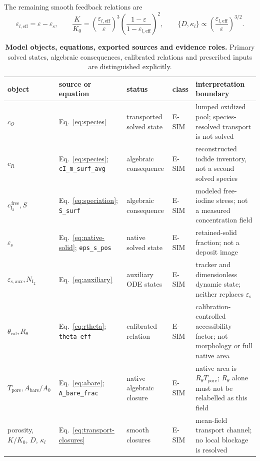 \documentclass[11pt]{article}
\newcommand{\epss}{\varepsilon_{\mathrm{s}}}
\newcommand{\epsaux}{\varepsilon_{\mathrm{s,aux}}}
\newcommand{\thetacal}{\theta_{\mathrm{cal}}}
\newcommand{\Rtheta}{R_{\theta}}
\newcommand{\Tpore}{T_{\mathrm{pore}}}
\newcommand{\cf}{c_{\mathrm{I_2}}^{\,\mathrm{free}}}
\begin{document}
The remaining smooth feedback relations are
\begin{equation}
\varepsilon_{l,\mathrm{eff}}=\varepsilon-\epss,\qquad
\frac{K}{K_0}=\left(\frac{\varepsilon_{l,\mathrm{eff}}}{\varepsilon}\right)^3
\left(\frac{1-\varepsilon}{1-\varepsilon_{l,\mathrm{eff}}}\right)^2,\qquad
\{D,\kappa_l\}\propto\left(\frac{\varepsilon_{l,\mathrm{eff}}}{\varepsilon}\right)^{3/2}.
\label{eq:transport-closures}
\end{equation}

\begin{table}[!htbp]
\centering\footnotesize
\caption{\textbf{Model objects, equations, exported sources and evidence roles.} Primary solved states,
algebraic consequences, calibrated relations and prescribed inputs are distinguished explicitly.}
\label{tab:model-map}
\begin{tabularx}{\textwidth}{@{}P{2.25cm}P{2.55cm}P{2.15cm}P{1.25cm}Y@{}}
\toprule
object & source or equation & status & class & interpretation boundary\\
\midrule
$c_O$ & Eq.~\eqref{eq:species} & transported solved state & E-SIM & lumped oxidized pool; species-resolved transport is not solved\\
$c_R$ & Eq.~\eqref{eq:species}; \texttt{cI\_m\_surf\_avg} & algebraic consequence & E-SIM & reconstructed iodide inventory, not a second solved species\\
$\cf,S$ & Eq.~\eqref{eq:speciation}; \texttt{S\_surf} & algebraic consequence & E-SIM & modeled free-iodine stress; not a measured concentration field\\
$\epss$ & Eq.~\eqref{eq:native-solid}; \texttt{eps\_s\_pos} & native solved state & E-SIM & retained-solid fraction; not a deposit image\\
$\epsaux,N_{\mathrm{I_2}}$ & Eq.~\eqref{eq:auxiliary} & auxiliary ODE states & E-SIM & tracker and dimensionless dynamic state; neither replaces $\epss$\\
$\thetacal,\Rtheta$ & Eq.~\eqref{eq:rtheta}; \texttt{theta\_eff} & calibrated relation & E-SIM & calibration-controlled accessibility factor; not morphology or full native area\\
$\Tpore,A_{\mathrm{bare}}/A_0$ & Eq.~\eqref{eq:abare}; \texttt{A\_bare\_frac} & native algebraic closure & E-SIM & native area is $\Rtheta\Tpore$; $\Rtheta$ alone must not be relabelled as this field\\
porosity, $K/K_0$, $D$, $\kappa_l$ & Eq.~\eqref{eq:transport-closures} & smooth closures & E-SIM & mean-field transport channel; no local blockage is resolved\\

\end{tabularx}
\end{table}
\end{document}

